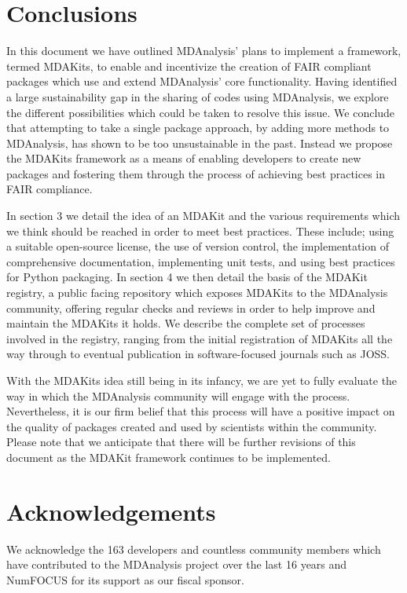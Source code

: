 \documentclass{article}
\begin{document}
\section{Conclusions}

In this document we have outlined MDAnalysis’ plans to implement a framework, termed MDAKits, to enable and incentivize the creation of FAIR compliant packages which use and extend MDAnalysis’ core functionality. Having identified a large sustainability gap in the sharing of codes using MDAnalysis, we explore the different possibilities which could be taken to resolve this issue. We conclude that attempting to take a single package approach, by adding more methods to MDAnalysis, has shown to be too unsustainable in the past. Instead we propose the MDAKits framework as a means of enabling developers to create new packages and fostering them through the process of achieving best practices in FAIR compliance.

In section 3 we detail the idea of an MDAKit and the various requirements which we think should be reached in order to meet best practices. These include; using a suitable open-source license, the use of version control, the implementation of comprehensive documentation, implementing unit tests, and using best practices for Python packaging. In section 4 we then detail the basis of the MDAKit registry, a public facing repository which exposes MDAKits to the MDAnalysis community, offering regular checks and reviews in order to help improve and maintain the MDAKits it holds. We describe the complete set of processes involved in the registry, ranging from the initial registration of MDAKits all the way through to eventual publication in software-focused journals such as JOSS.

With the MDAKits idea still being in its infancy, we are yet to fully evaluate the way in which the MDAnalysis community will engage with the process. Nevertheless, it is our firm belief that this process will have a positive impact on the quality of packages created and used by scientists within the community. Please note that we anticipate that there will be further revisions of this document as the MDAKit framework continues to be implemented.


\section{Acknowledgements}

We acknowledge the 163 developers and countless community members which have contributed to the MDAnalysis project over the last 16 years and NumFOCUS for its support as our fiscal sponsor.
\end{document}
